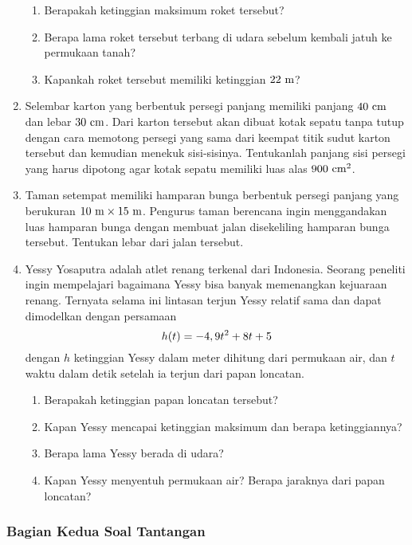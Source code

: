 \begin{enumerate}[topsep=0pt]
			\begin{enumerate}
				\item Berapakah ketinggian maksimum roket tersebut?
				\item Berapa lama roket tersebut terbang di udara sebelum kembali jatuh ke permukaan tanah?
				\item Kapankah roket tersebut memiliki ketinggian $ 22 \mathop{}\!\, \mathrm{{m}} $?
			\end{enumerate}
			\item \probtype{$ \approx $} Selembar karton yang berbentuk persegi panjang memiliki panjang $ 40 \mathop{}\!\, \mathrm{{cm}} $ dan lebar $ 30 \mathop{}\!\, \mathrm{{cm}} $. Dari karton tersebut akan dibuat kotak sepatu tanpa tutup  dengan cara memotong persegi yang sama dari keempat titik sudut karton tersebut dan kemudian menekuk sisi-sisinya. Tentukanlah panjang sisi persegi yang harus dipotong agar kotak sepatu memiliki luas alas $ 900 \mathop{}\!\, \mathrm{{cm^{2}}} $.
			\item Taman setempat memiliki hamparan bunga berbentuk persegi panjang yang berukuran $ 10 \mathop{}\!\, \mathrm{{m}} \times 15 \mathop{}\!\, \mathrm{{m}} $. Pengurus taman berencana ingin menggandakan luas hamparan bunga dengan membuat jalan disekeliling hamparan bunga tersebut. Tentukan lebar dari jalan tersebut.
			\item \probtype{$ \approx $} Yessy Yosaputra adalah atlet renang terkenal dari Indonesia. Seorang peneliti ingin mempelajari bagaimana Yessy bisa banyak memenangkan kejuaraan renang. Ternyata selama ini lintasan terjun Yessy relatif sama dan dapat dimodelkan dengan persamaan
			\[ \mathop{}\!{h}{\left({t}\right)} = -4,9t^{2} + 8t + 5 \]
			dengan $ h $ ketinggian Yessy dalam meter dihitung dari permukaan air, dan $ t $ waktu dalam detik setelah ia terjun dari papan loncatan.
			\begin{enumerate}
				\item Berapakah ketinggian papan loncatan tersebut?
				\item Kapan Yessy mencapai ketinggian maksimum dan berapa ketinggiannya?
				\item Berapa lama Yessy berada di udara?
				\item Kapan Yessy menyentuh permukaan air? Berapa jaraknya dari papan loncatan?
			\end{enumerate}
		\end{enumerate}
	
	\subsubsection{Bagian Kedua \dashh Soal Tantangan}
		
